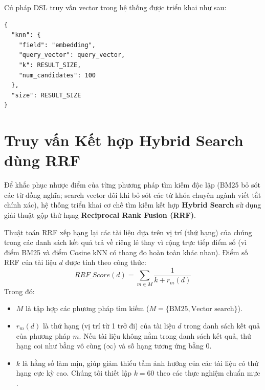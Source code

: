 Cú pháp DSL truy vấn vector trong hệ thống được triển khai như sau:
\begin{lstlisting}[caption={Elasticsearch Vector Query DSL},label={lst:knn-dsl}]
{
  "knn": {
    "field": "embedding",
    "query_vector": query_vector,
    "k": RESULT_SIZE,
    "num_candidates": 100
  },
  "size": RESULT_SIZE
}
\end{lstlisting}

\section{Truy vấn Kết hợp Hybrid Search dùng RRF}
Để khắc phục nhược điểm của từng phương pháp tìm kiếm độc lập (BM25 bỏ sót các từ đồng nghĩa; search vector đôi khi bỏ sót các từ khóa chuyên ngành viết tắt chính xác), hệ thống triển khai cơ chế tìm kiếm kết hợp \textbf{Hybrid Search} sử dụng giải thuật gộp thứ hạng \textbf{Reciprocal Rank Fusion (RRF)}.

Thuật toán RRF xếp hạng lại các tài liệu dựa trên vị trí (thứ hạng) của chúng trong các danh sách kết quả trả về riêng lẻ thay vì cộng trực tiếp điểm số (vì điểm BM25 và điểm Cosine kNN có thang đo hoàn toàn khác nhau). 
Điểm số RRF của tài liệu $d$ được tính theo công thức:
\begin{equation}
RRF\_Score(d) = \sum_{m \in M} \frac{1}{k + r_m(d)}
\end{equation}
Trong đó:
\begin{itemize}
    \item $M$ là tập hợp các phương pháp tìm kiếm ($M = \{\text{BM25}, \text{Vector search}\}$).
    \item $r_m(d)$ là thứ hạng (vị trí từ 1 trở đi) của tài liệu $d$ trong danh sách kết quả của phương pháp $m$. Nếu tài liệu không nằm trong danh sách kết quả, thứ hạng coi như bằng vô cùng ($\infty$) và số hạng tương ứng bằng 0.
    \item $k$ là hằng số làm mịn, giúp giảm thiểu tầm ảnh hưởng của các tài liệu có thứ hạng cực kỳ cao. Chúng tôi thiết lập $k = 60$ theo các thực nghiệm chuẩn mực \cite{cormack2009rrf}.
\end{itemize}

